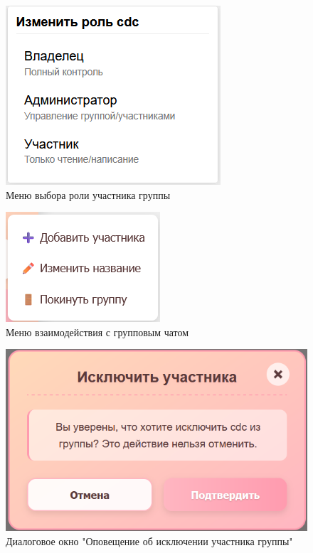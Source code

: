 \begin{figure}[h]
	\centering
	\includegraphics[width=0.8\linewidth]{"images/Меню с ролями"}
	\caption{Меню выбора роли участника группы}
	\label{fig:role-dialog}
\end{figure}

\begin{figure}[h]
	\centering
	\includegraphics[width=0.8\linewidth]{"images/Меню взаимодействия с групповым чатом "}
	\caption{Меню взаимодействия с групповым чатом}
	\label{fig:menu-group}
\end{figure}

\begin{figure}[h]
	\centering
	\includegraphics[width=0.8\linewidth]{"images/Окно уточнения исключения"}
	\caption{Диалоговое окно "Оповещение об исключении участника группы"}
	\label{fig:get-out-menu}
\end{figure}

